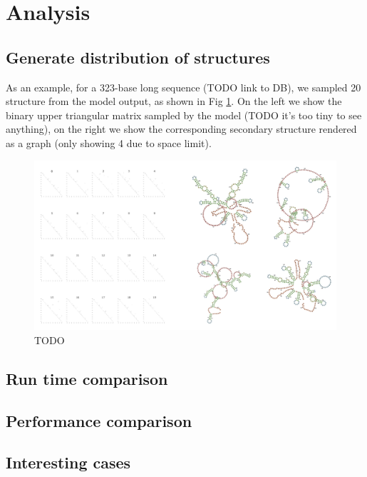 \documentclass{article}
\begin{document}
\section{Analysis}

\subsection{Generate distribution of structures}

As an example, for a 323-base long sequence (TODO link to DB),
we sampled 20 structure from the model output, as shown in Fig \ref{fig:sampled_structures}.
On the left we show the binary upper triangular matrix sampled by the model (TODO it's too tiny to see anything),
on the right we show the corresponding secondary structure rendered as a graph (only showing 4 due to space limit).


\begin{figure}[h!]
    \centering
    \includegraphics[width=\textwidth]{plot/sampled_structures.png}
    \caption{TODO}
    \label{fig:sampled_structures}
    \centering
\end{figure}




\subsection{Run time comparison}

\subsection{Performance comparison}

\subsection{Interesting cases}
\end{document}
